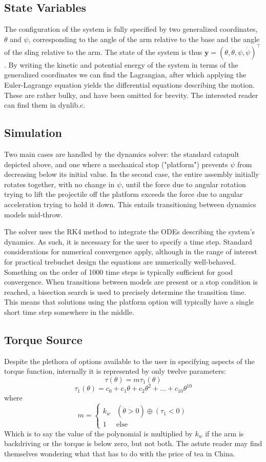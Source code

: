 \documentclass{article}
\begin{document}
\subsection{State Variables}
The configuration of the system is fully specified by two generalized coordinates, $\theta$ and $\psi$, corresponding to the angle of the arm relative to the base and the angle of the sling relative to the arm. The state of the system is thus $\mathbf{y} = (\theta, \dot{\theta}, \psi, \dot{\psi})^\top$. By writing the kinetic and potential energy of the system in terms of the generalized coordinates we can find the Lagrangian, after which applying the Euler-Lagrange equation yields the differential equations describing the motion. These are rather bulky, and have been omitted for brevity. The interested reader can find them in dynlib.c.

\subsection{Simulation} \label{Simulation}
Two main cases are handled by the dynamics solver: the standard catapult depicted above, and one where a mechanical stop ("platform") prevents $\psi$ from decreasing below its initial value. In the second case, the entire assembly initially rotates together, with no change in $\psi$, until the force due to angular rotation trying to lift the projectile off the platform exceeds the force due to angular acceleration trying to hold it down. This entails transitioning between dynamics models mid-throw.\par

The solver uses the RK4 method to integrate the ODEs describing the system's dynamics. As such, it is necessary for the user to specify a time step. Standard considerations for numerical convergence apply, although in the range of interest for practical trebuchet design the equations are numerically well-behaved. Something on the order of 1000 time steps is typically sufficient for good convergence. When transitions between models are present or a stop condition is reached, a bisection search is used to precisely determine the transition time. This means that solutions using the platform option will typically have a single short time step somewhere in the middle. \par


\subsection{Torque Source}
Despite the plethora of options available to the user in specifying aspects of the torque function, internally it is represented by only twelve parameters:
\[\tau(\theta) = m\tau_1(\theta)\]
\[\tau_1(\theta) = c_0 + c_1\theta + c_2\theta^2 + \ldots + c_{10}\theta^{10}\]
where
\[m = \begin{cases} k_w &(\dot{\theta}>0)\oplus(\tau_1<0)\\
1 & \mbox{else } \end{cases}\]
Which is to say the value of the polynomial is multiplied by $k_w$ if the arm is backdriving or the torque is below zero, but not both. The astute reader may find themselves wondering what that has to do with the price of tea in China.
\end{document}
